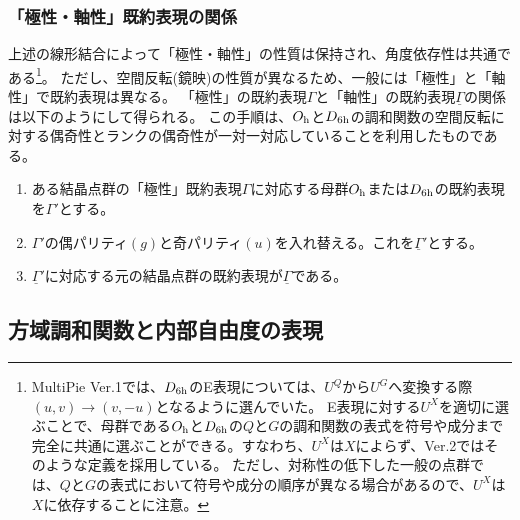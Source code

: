 \documentclass[11pt]{easymemo}
\begin{document}
\subsubsection{「極性・軸性」既約表現の関係}

上述の線形結合によって「極性・軸性」の性質は保持され、角度依存性は共通である\footnote{
MultiPie Ver.1では、$D_{\rm 6h}$のE表現については、$U^{Q}$から$U^{G}$へ変換する際$(u,v)\to(v,-u)$となるように選んでいた。
E表現に対する$U^{X}$を適切に選ぶことで、母群である$O_{\rm h}$と$D_{\rm 6h}$の$Q$と$G$の調和関数の表式を符号や成分まで完全に共通に選ぶことができる。すなわち、$U^{X}$は$X$によらず、Ver.2ではそのような定義を採用している。
ただし、対称性の低下した一般の点群では、$Q$と$G$の表式において符号や成分の順序が異なる場合があるので、$U^{X}$は$X$に依存することに注意。
}。
ただし、空間反転(鏡映)の性質が異なるため、一般には「極性」と「軸性」で既約表現は異なる。
「極性」の既約表現$\Gamma$と「軸性」の既約表現$\underline{\Gamma}$の関係は以下のようにして得られる。
この手順は、$O_{\rm h}$と$D_{\rm 6h}$の調和関数の空間反転に対する偶奇性とランクの偶奇性が一対一対応していることを利用したものである。
\begin{enumerate}
  \item ある結晶点群の「極性」既約表現$\Gamma$に対応する母群$O_{\rm h}$または$D_{\rm 6h}$の既約表現を$\Gamma'$とする。
  \item $\Gamma'$の偶パリティ$(g)$と奇パリティ$(u)$を入れ替える。これを$\underline{\Gamma}'$とする。
  \item $\underline{\Gamma}'$に対応する元の結晶点群の既約表現が$\underline{\Gamma}$である。
\end{enumerate}


\subsection{方域調和関数と内部自由度の表現}
\end{document}

